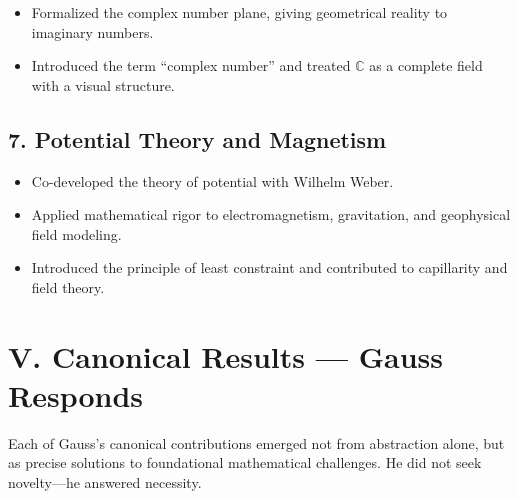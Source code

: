 \documentclass[9pt]{article}
\begin{document}
\begin{itemize}
  \item Formalized the complex number plane, giving geometrical reality to imaginary numbers.
  \item Introduced the term “complex number” and treated $\mathbb{C}$ as a complete field with a visual structure.
\end{itemize}

\subsection*{7. Potential Theory and Magnetism}

\begin{itemize}
  \item Co-developed the theory of potential with Wilhelm Weber.
  \item Applied mathematical rigor to electromagnetism, gravitation, and geophysical field modeling.
  \item Introduced the principle of least constraint and contributed to capillarity and field theory.
\end{itemize}

\newpage

\section*{V. Canonical Results — Gauss Responds}

Each of Gauss’s canonical contributions emerged not from abstraction alone, but as precise solutions to foundational mathematical challenges.  
He did not seek novelty—he answered necessity.

\vspace{1em}
\end{document}
